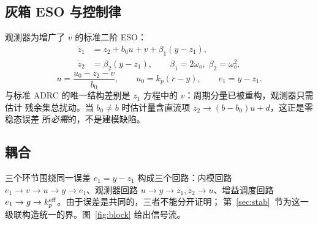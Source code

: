 \documentclass[journal]{IEEEtran}
\theoremstyle{remark}
\begin{document}
\subsection{灰箱 ESO 与控制律}
观测器为增广了 $v$ 的标准二阶 ESO：
\begin{equation}
\begin{aligned}
\dot z_1&=z_2+b_0u+v+\beta_1(y-z_1),\\
\dot z_2&=\beta_2(y-z_1),\qquad \beta_1=2\omega_o,\;\beta_2=\omega_o^2 ,
\end{aligned}
\label{eq:eso}
\end{equation}
\begin{equation}
u=\frac{u_0-z_2-v}{b_0},\qquad u_0=k_p(r-y),\qquad e_1=y-z_1 .
\label{eq:law}
\end{equation}
与标准 ADRC 的唯一结构差别是 $z_1$ 方程中的 $v$：周期分量已被重构，观测器只需估计
残余集总扰动。当 $b_0\ne b$ 时估计量含直流项 $z_2\to(b-b_0)u+d$，这正是零稳态误差
所\emph{必需}的，不是建模缺陷。

\subsection{耦合}
三个环节围绕同一误差 $e_1=y-z_1$ 构成三个回路：内模回路
$e_1\to v\to u\to y\to e_1$、观测器回路 $u\to y\to z_1,z_2\to u$、增益调度回路
$e_1\to g\to k_p^{\rm eff}$。由于误差是共同的，三者不能分开证明；
第~\ref{sec:stab}~节为这一级联构造统一的界。图~\ref{fig:block} 给出信号流。
\end{document}
